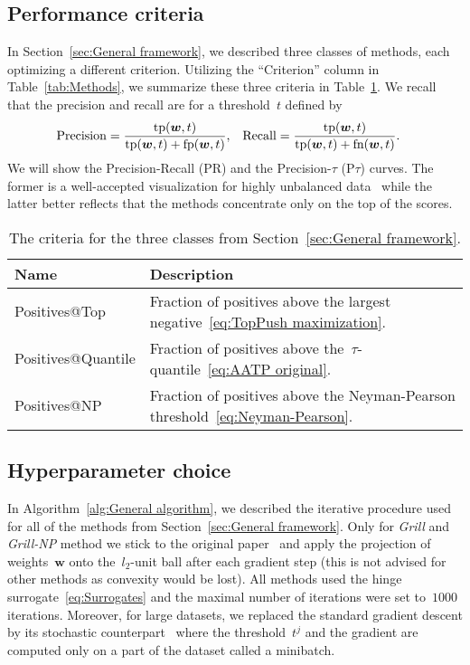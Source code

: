 \documentclass[11pt,a4paper]{article}
\theoremstyle{definition}
\newcommand{\precision}{\operatorname*{Precision}}
\newcommand{\recall}{\operatorname*{Recall}}
\newcommand{\tp}{\textnormal{tp}}
\newcommand{\fp}{\textnormal{fp}}
\newcommand{\fn}{\textnormal{fn}}
\newcommand{\grill}{\textit{Grill}\xspace}
\newcommand{\grillnp}{\textit{Grill-NP}\xspace}
\begin{document}
\subsection{Performance criteria}

In Section~\ref{sec:General framework}, we described three classes of methods, each optimizing a different criterion. Utilizing the ``Criterion'' column in Table~\ref{tab:Methods}, we summarize these three criteria in Table~\ref{tab:criteria}. We recall that the precision and recall are for a threshold~$t$ defined by
\begin{equation*}
  \begin{aligned}
    \precision & = \frac{\tp(\bm{w},t)}{\tp(\bm{w},t)+\fp(\bm{w},t)}, &
    \recall    & = \frac{\tp(\bm{w},t)}{\tp(\bm{w},t)+\fn(\bm{w},t)}.
  \end{aligned}
\end{equation*}
We will show the Precision-Recall (PR) and the Precision-$\tau$ (P$\tau$) curves. The former is a well-accepted visualization for highly unbalanced data~\cite{davis2006relationship} while the latter better reflects that the methods concentrate only on the top of the scores.

\begin{table}[!ht]
  \caption{The criteria for the three classes from Section~\ref{sec:General framework}.}
  \label{tab:criteria}
  \centering
  \begin{tabular}{@{} ll @{}}
    \toprule
    \bf Name           & \bf Description \\
    \midrule
    Positives@Top      & Fraction of positives above the largest negative~\eqref{eq:TopPush maximization}. \\
    Positives@Quantile & Fraction of positives above the~$\tau$-quantile~\eqref{eq:AATP original}. \\
    Positives@NP       & Fraction of positives above the Neyman-Pearson threshold~\eqref{eq:Neyman-Pearson}. \\
    \bottomrule
  \end{tabular}
\end{table}


\subsection{Hyperparameter choice}

In Algorithm~\ref{alg:General algorithm}, we described the iterative procedure used for all of the methods from Section~\ref{sec:General framework}. Only for \grill and \grillnp method we stick to the original paper~\cite{grill2016learning} and apply the projection of weights~$\bm{w}$ onto the~$l_2$-unit ball after each gradient step (this is not advised for other methods as convexity would be lost). All methods used the hinge surrogate~\eqref{eq:Surrogates} and the maximal number of iterations were set to~$1000$ iterations. Moreover, for large datasets, we replaced the standard gradient descent by its stochastic counterpart~\cite{bottou2010large} where the threshold~$t^j$ and the gradient are computed only on a part of the dataset called a minibatch.
\end{document}
